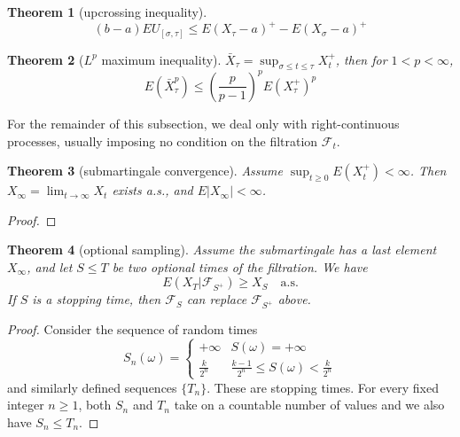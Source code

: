 \documentclass{article}
\newtheorem{Thm}{Theorem}[section]
\theoremstyle{definition}
\begin{document}
\begin{Thm}[upcrossing inequality]
    \[(b-a)EU_{[\sigma,\tau]}\le E(X_\tau-a)^+-E(X_\sigma-a)^+\]
\end{Thm}

\begin{Thm}[$L^p$ maximum inequality]
    $\bar{X}_\tau= \sup_{\sigma\le t\le \tau}X_t^+$, then for $1<p<\infty$, \[E(\bar{X}_\tau^p)\le (\frac{p}{p-1})^pE(X_\tau^+)^p\]
\end{Thm}



For the remainder of this subsection, we deal only with right-continuous processes,
usually imposing no condition on the filtration $\mathcal{F}_t$.
\begin{Thm}[submartingale convergence]
    Assume $\sup_{t\ge 0} E(X_t^+)<\infty$. Then $X_\infty =\lim_{t\to\infty} X_t$ exists a.s., and $E|X_\infty|<\infty$.
\end{Thm}
\begin{proof}
    
\end{proof}

\begin{Thm}[optional sampling]
    Assume the submartingale has a last element $X_\infty$,
    and let $S\le T$ be two optional times of the filtration. We have 
    \[ E(X_T|\mathcal{F}_{S^+})\ge X_S \quad \text{a.s.}\] 
    If $S$ is a stopping time, then $\mathcal{F}_S$ can replace $\mathcal{F}_{S^+}$ above.
\end{Thm}
\begin{proof}
    Consider the sequence of random times 
    \[S_n(\omega)=\left\{\begin{matrix}
        +\infty   & S(\omega )=+\infty \\
        \frac{k}{2^n}   & \frac{k-1}{2^n} \le S(\omega )<\frac{k}{2^n} 
        \end{matrix}\right. \]
    and similarly defined sequences $\{T_n\}$. These are stopping times.
    For every fixed integer $n\ge 1$, both $S_n$ and $T_n$ take on a countable number of values and we also have $S_n\le T_n$.
\end{proof}
\end{document}
